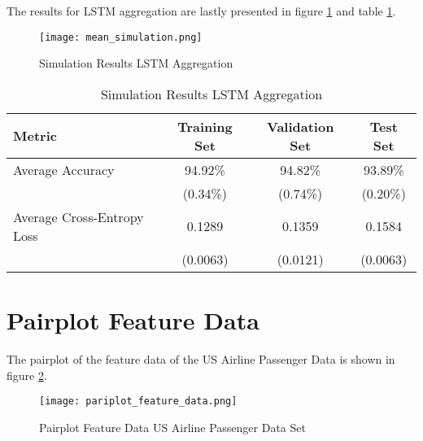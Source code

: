   \noindent The results for LSTM aggregation are lastly presented in figure
  \ref{fig:lstm_sim} and table \ref{table:lstm_sim}. 

  \begin{figure}[h]
		\centering
		\texttt{[image: mean\_simulation.png]}
		\caption{Simulation Results LSTM Aggregation}
        \label{fig:lstm_sim}
  \end{figure}

  \begin{table}[h]
    \centering
      \begin{tabular}{|l||c|c|c|}
      \hline
      \textbf{Metric} & \textbf{Training Set} & \textbf{Validation Set} & 
      \textbf{Test Set}\\
      \hline\hline
      Average Accuracy & 94.92\% & 94.82\% & 93.89\% \\\hline 
                       & (0.34\%) & (0.74\%) & (0.20\%) \\\hline
      Average Cross-Entropy Loss & 0.1289 & 0.1359 & 0.1584 \\\hline
                                 & (0.0063) & (0.0121) & (0.0063) \\
      \hline
    \end{tabular}
    \caption{Simulation Results LSTM Aggregation}
    \label{table:lstm_sim}
  \end{table}


  \section{Pairplot Feature Data}
  \label{App:pairplot}
  
  The pairplot of the feature data of the US Airline Passenger Data is shown in
  figure \ref{fig:pairplot_feature}.

  \begin{figure}[h]
		\centering
		\texttt{[image: pariplot\_feature\_data.png]}
		\caption{Pairplot Feature Data US Airline Passenger Data Set}
        \label{fig:pairplot_feature}
  \end{figure}
